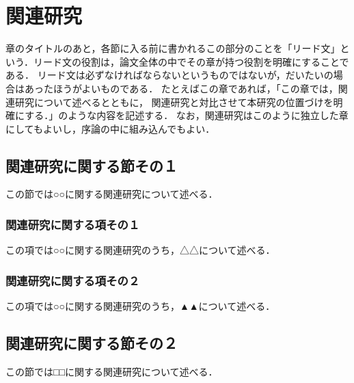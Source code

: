 \chapter{関連研究}	%
\thispagestyle{plain}   %

章のタイトルのあと，各節に入る前に書かれるこの部分のことを「リード文」という．リード文の役割は，論文全体の中でその章が持つ役割を明確にすることである．
リード文は必ずなければならないというものではないが，だいたいの場合はあったほうがよいものである．
たとえばこの章であれば，「この章では，関連研究について述べるとともに，
関連研究と対比させて本研究の位置づけを明確にする．」のような内容を記述する．
なお，関連研究はこのように独立した章にしてもよいし，序論の中に組み込んでもよい．

\section{関連研究に関する節その１}
この節では○○に関する関連研究について述べる．

\subsection{関連研究に関する項その１}
この項では○○に関する関連研究のうち，△△について述べる．

\subsection{関連研究に関する項その２}
この項では○○に関する関連研究のうち，▲▲について述べる．

\section{関連研究に関する節その２}
この節では□□に関する関連研究について述べる．


